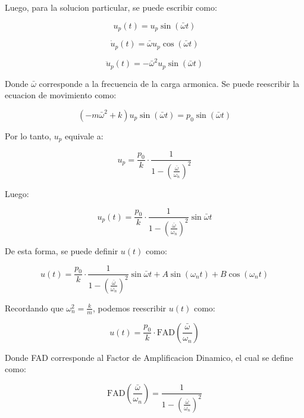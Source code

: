 \documentclass{article}  %
\begin{document}
Luego, para la solucion particular, se puede escribir como:

\begin{equation}
    u_p(t) = u_p \sin(\bar{\omega} t )
\end{equation}

\begin{equation}
    \dot{u}_p(t) = \bar{\omega} u_p \cos(\bar{\omega} t )
\end{equation}

\begin{equation}
    \ddot{u}_p(t) = -\bar{\omega}^2 u_p \sin(\bar{\omega} t )
\end{equation}

Donde $\bar{\omega}$ corresponde a la frecuencia de la carga armonica. Se puede reescribir la ecuacion de movimiento como:

\begin{equation}
    (-m \bar{\omega}^2 + k)u_p \sin(\bar{\omega} t ) = p_0 \sin(\bar{\omega} t )
\end{equation}

Por lo tanto, $u_p$ equivale a:

\begin{equation}
    u_p = \frac{p_0}{k} \cdot \frac{1}{1-(\frac{\bar{\omega}}{\omega_n})^2}
\end{equation}

Luego:

\begin{equation}
    u_p(t) = \frac{p_0}{k} \cdot \frac{1}{1-(\frac{\bar{\omega}}{\omega_n})^2} \sin{\bar{\omega} t }
\end{equation}

De esta forma, se puede definir $u(t)$ como:

\begin{equation}
    u(t) = \frac{p_0}{k} \cdot \frac{1}{1-(\frac{\bar{\omega}}{\omega_n})^2} \sin{\bar{\omega} t } + A \sin(\omega_n t) + B \cos(\omega_n t)
\end{equation}

Recordando que $\omega_n^2 = \frac{k}{m}$, podemos reescribir $u(t)$ como:

\begin{equation}
    u(t) = \frac{p_0}{k} \cdot \text{FAD}(\frac{\bar\omega}{\omega_n})
\end{equation}

Donde FAD corresponde al Factor de Amplificacion Dinamico, el cual se define como:

\begin{equation}
    \text{FAD}(\frac{\bar\omega}{\omega_n}) = \frac{1}{1-(\frac{\bar{\omega}}{\omega_n})^2}
\end{equation}
\end{document}
